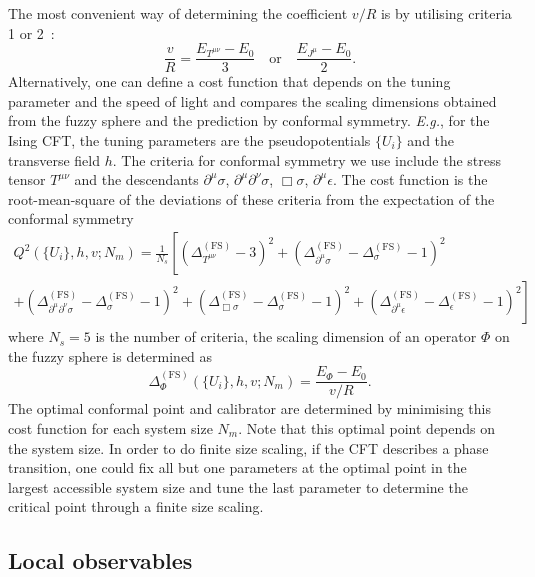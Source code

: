 \documentclass{timesjhep}
\begin{document}
The most convenient way of determining the coefficient $v/R$ is by utilising criteria 1 or 2~: 
\begin{equation}
    \frac{v}{R}=\frac{E_{T^{\mu\nu}}-E_0}{3}\quad\textrm{or}\quad\frac{E_{J^\mu}-E_0}{2}.
\end{equation}
Alternatively, one can define a cost function that depends on the tuning parameter and the speed of light and compares the scaling dimensions obtained from the fuzzy sphere and the prediction by conformal symmetry. \textit{E.g.}, for the Ising CFT, the tuning parameters are the pseudopotentials $\{U_i\}$ and the transverse field $h$. The criteria for conformal symmetry we use include the stress tensor $T^{\mu\nu}$ and the descendants $\partial^\mu\sigma$, $\partial^\mu\partial^\nu\sigma$, $\Box\sigma$, $\partial^\mu\epsilon$. The cost function is the root-mean-square of the deviations of these criteria from the expectation of the conformal symmetry 
\begin{multline}
    Q^2(\{U_i\},h,v;N_m)=\frac{1}{N_s}\left[(\Delta_{T^{\mu\nu}}^{(\mathrm{FS})}-3)^2+(\Delta_{\partial^\mu\sigma}^{(\mathrm{FS})}-\Delta_\sigma^{(\mathrm{FS})}-1)^2\right.\\
    \left.+(\Delta_{\partial^\mu\partial^\nu\sigma}^{(\mathrm{FS})}-\Delta_\sigma^{(\mathrm{FS})}-1)^2+(\Delta_{\Box\sigma}^{(\mathrm{FS})}-\Delta_\sigma^{(\mathrm{FS})}-1)^2+(\Delta_{\partial^\mu\epsilon}^{(\mathrm{FS})}-\Delta_\epsilon^{(\mathrm{FS})}-1)^2\right]
\end{multline} 
where $N_s=5$ is the number of criteria, the scaling dimension of an operator $\Phi$ on the fuzzy sphere is determined as 
\begin{equation}
    \Delta_\Phi^{(\mathrm{FS})}(\{U_i\},h,v;N_m)=\frac{E_\Phi-E_0}{v/R}. 
\end{equation} 
The optimal conformal point and calibrator are determined by minimising this cost function for each system size $N_m$. Note that this optimal point depends on the system size. In order to do finite size scaling, if the CFT describes a phase transition, one could fix all but one parameters at the optimal point in the largest accessible system size and tune the last parameter to determine the critical point through a finite size scaling. 

\subsection{Local observables}
\label{sec:construct_obs}
\end{document}
